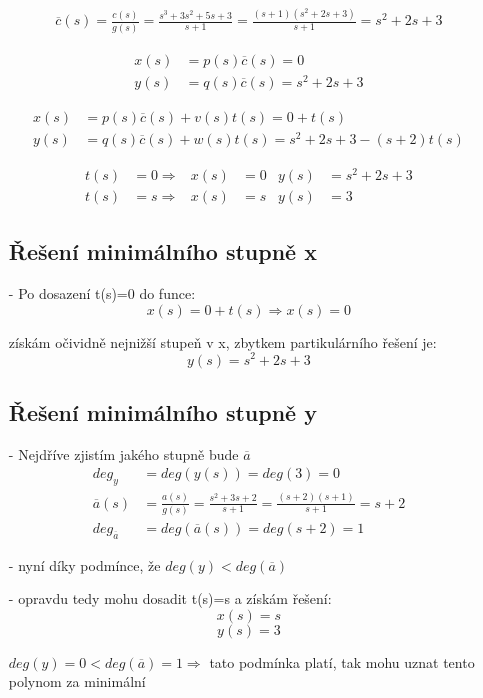 \documentclass{article}
\begin{document}
\begin{itemize}
    \begin{align*}
        \overline{c}(s) = \frac{c(s)}{g(s)} = \frac{s^3+3s^2+5s+3}{s+1} = \frac{(s+1)(s^2+2s+3)}{s+1} = s^2+2s+3
    \end{align*}
    
    \begin{align*}
        x(s) &= p(s)\overline{c}(s) = 0\\
        y(s) &= q(s)\overline{c}(s) = s^2+2s+3
    \end{align*}
    
    \begin{align*}
        x(s) &= p(s)\overline{c}(s) + v(s)t(s) = 0+t(s)\\
        y(s) &= q(s)\overline{c}(s) + w(s)t(s) = s^2+2s+3-(s+2)t(s)
    \end{align*}
    
    \begin{align*}
        t(s) &= 0 \Rightarrow & x(s) &= 0 & y(s) &= s^2+2s+3\\
        t(s) &= s \Rightarrow & x(s) &= s & y(s) &= 3
    \end{align*}

    \subsection{Řešení minimálního stupně x}
    \item[-] Po dosazení t(s)=0 do funce:
    \[x(s) = 0+t(s) \Rightarrow x(s) = 0\]
    \item[] získám očividně nejnižší stupeň v x, zbytkem partikulárního řešení je:\\
    \[y(s)= s^2+2s+3\]
    
    \subsection{Řešení minimálního stupně y}
    \item[-] Nejdříve zjistím jakého stupně bude $\overline{a}$
    \begin{align*}
        deg_y &= deg(y(s)) = deg(3) = 0\\
        \overline{a}(s) &= \frac{a(s)}{g(s)} = \frac{s^2+3s+2}{s+1} = \frac{(s+2)(s+1)}{s+1} = s+2\\
        deg_{\overline{a}} &= deg(\overline{a}(s)) = deg(s+2) = 1
    \end{align*}
    \item[-] nyní díky podmínce, že $deg(y) < deg(\overline{a})$ 
    \item[-] opravdu tedy mohu dosadit t(s)=s a získám řešení:
    \[x(s) = s\]
    \[y(s) = 3\]
    \item[] $deg(y) = 0 < deg(\overline{a}) = 1 \Rightarrow$ tato podmínka platí, tak mohu uznat tento polynom za minimální 
    

\end{itemize}
\end{document}
